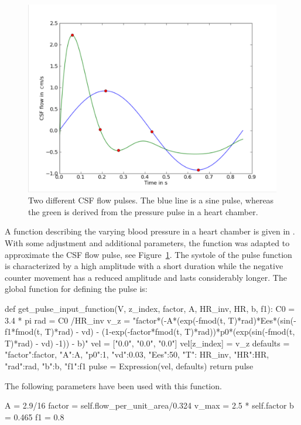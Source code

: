 \begin{figure}
\bwfig
  \centering
  \includegraphics[width=\largefig]{chapters/hentschel/pdf/sin_pulse.pdf}
  \caption{Two different CSF flow pulses. The blue line is a sine pulse,
    whereas the green is derived from the pressure pulse in a heart
    chamber.}
  \label{fig:sin_pulse}
\end{figure}

A function describing the varying blood pressure in a heart chamber is
given in \citet{SmithChase2ShawEtAl2006}.  With some adjustment and
additional parameters, the function was adapted to approximate the CSF
flow pulse, see Figure~\ref{fig:sin_pulse}.  The systole of the pulse
function is characterized by a high amplitude with a short duration
while the negative counter movement has a reduced amplitude and lasts
considerably longer.  The global function for defining the pulse is:
\begin{python}
def get_pulse_input_function(V, z_index, factor, A, HR_inv, HR, b, f1):
    C0 = 3.4 * pi
    rad = C0 /HR_inv
    v_z = "factor*(-A*(exp(-fmod(t, T)*rad)*Ees*(sin(-f1*fmod(t, T)*rad) - vd)
     - (1-exp(-factor*fmod(t, T)*rad))*p0*(exp(sin(-fmod(t, T)*rad) - vd) -1)) - b)"
    vel = ["0.0", "0.0", "0.0"]
    vel[z_index] = v_z
   defaults = {"factor":factor, "A":A, "p0":1, "vd":0.03, "Ees":50,
               "T": HR_inv, "HR":HR, "rad":rad, "b":b, "f1":f1}
    pulse = Expression(vel, defaults)
    return pulse
\end{python}
The following parameters have been used with this function.
\begin{python}
A = 2.9/16
factor = self.flow_per_unit_area/0.324
v_max = 2.5 * self.factor
b = 0.465
f1 = 0.8
\end{python}

